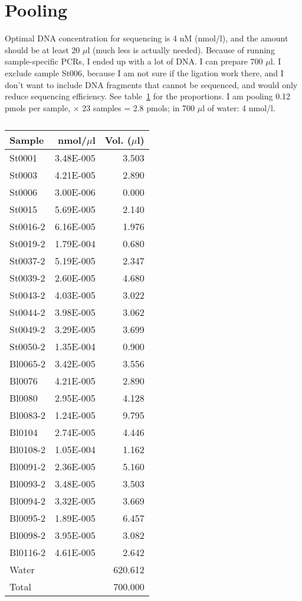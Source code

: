 \documentclass[a4paper,12pt,twosided]{article}
\begin{document}
\section{Pooling}
Optimal DNA concentration for sequencing is 4 nM (nmol/l), and the amount should be at least 20 $\mu$l (much less is actually needed). Because of running sample-specific PCRs, I ended up with a lot of DNA. I can prepare 700 $\mu$l. I exclude sample St006, because I am not sure if the ligation work there, and I don't want to include DNA fragments that cannot be sequenced, and would only reduce sequencing efficiency. See table~\ref{tau:pool} for the proportions. I am pooling 0.12 pmols per sample, $\times$ 23 samples = 2.8 pmols; in 700 $\mu$l of water: 4 nmol/l.

\begin{table}
\begin{center}
\caption{}\label{tau:pool}
\vspace*{0.2cm}
\begin{tabular}{lrr}
\toprule
Sample&nmol/$\mu$l&Vol. ($\mu$l)\\
\midrule
St0001&3.48E-005&3.503\\
St0003&4.21E-005&2.890\\
St0006&3.00E-006&0.000\\
St0015&5.69E-005&2.140\\
St0016-2&6.16E-005&1.976\\
St0019-2&1.79E-004&0.680\\
St0037-2&5.19E-005&2.347\\
St0039-2&2.60E-005&4.680\\
St0043-2&4.03E-005&3.022\\
St0044-2&3.98E-005&3.062\\
St0049-2&3.29E-005&3.699\\
St0050-2&1.35E-004&0.900\\
Bl0065-2&3.42E-005&3.556\\
Bl0076&4.21E-005&2.890\\
Bl0080&2.95E-005&4.128\\
Bl0083-2&1.24E-005&9.795\\
Bl0104&2.74E-005&4.446\\
Bl0108-2&1.05E-004&1.162\\
Bl0091-2&2.36E-005&5.160\\
Bl0093-2&3.48E-005&3.503\\
Bl0094-2&3.32E-005&3.669\\
Bl0095-2&1.89E-005&6.457\\
Bl0098-2&3.95E-005&3.082\\
Bl0116-2&4.61E-005&2.642\\
\midrule
Water&&620.612\\
\midrule
Total&&700.000\\
\bottomrule
\end{tabular}
\end{center}
\end{table}
\end{document}
